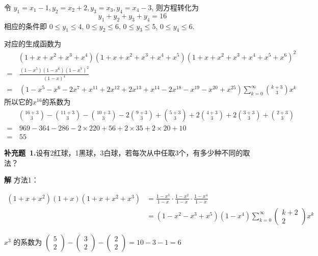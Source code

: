 \documentclass{report}
\begin{document}
令 $y_{1}=x_{1}-1, y_{2}=x_{2}+2, y_{3}=x_{3}, y_{4}=x_{4}-3$, 则方程转化为
$$
y_{1}+y_{2}+y_{3}+y_{4}=16
$$
相应的条件即 $0 \leq y_{1} \leq 4$, $0 \leq y_{2} \leq 6$, $0 \leq y_{3} \leq 5$, $0 \leq y_{4} \leq 6$.

对应的生成函数为
\begin{align*}
    & (1+x+x^2+x^3+x^4)
    (1+x+x^2+x^3+x^4+x^5)
    (1+x+x^2+x^3+x^4+x^5+x^6)^2\\
    = & \,  \frac{(1-x^5)(1-x^6)(1-x^7)^2}{(1-x)^4}\\
    = & \,
    (1 - x^5 - x^6 - 2 x^7 + x^{11} + 2 x^{12} + 2 x^{13} + x^{14} -
    2 x^{18} - x^{19} - x^{20} + x^{25}) \sum_{k=0}^{\infty} \binom{k+3}{3} x^k
\end{align*}
所以它的$x^{16}$的系数为
\begin{align*}
    & \binom{16+3}{3}
    -\binom{11+3}{3}
    -\binom{10+3}{3}
    -2\binom{9+3}{3}
    + \binom{5+3}{3}
    +2\binom{4+3}{3}
    +2\binom{3+3}{3}
    +\binom{2+3}{3} \\
    = & \,969 -  364 - 286 -2 \times 220 + 56  +2 \times 35 +2 \times 20 + 10 \\
    = & \,55
\end{align*}


\textbf{补充题\ 1.}设有2红球，1黑球，3白球，若每次从中任取3个，有多少种不同的取法？

\textbf{解  }方法1：

$\begin{aligned}\left(1+x+x^{2}\right)(1+x)\left(1+x+x^{2}+x^{3}\right) &=\frac{1-x^{3}}{1-x} \cdot \frac{1-x^{2}}{1-x} \cdot \frac{1-x^{4}}{1-x} \\ &=\left(1-x^{2}-x^{3}+x^{5}\right)\left(1-x^{4}\right) \sum_{k=0}^{\infty}\left(\begin{array}{c}k+2 \\ 2\end{array}\right) x^{k} \end{aligned}$

$x^{3}$ 的系数为 $\left(\begin{array}{l}5 \\ 2\end{array}\right)-\left(\begin{array}{l}3 \\ 2\end{array}\right)-\left(\begin{array}{l}2 \\ 2\end{array}\right)=10-3-1=6$
\end{document}
